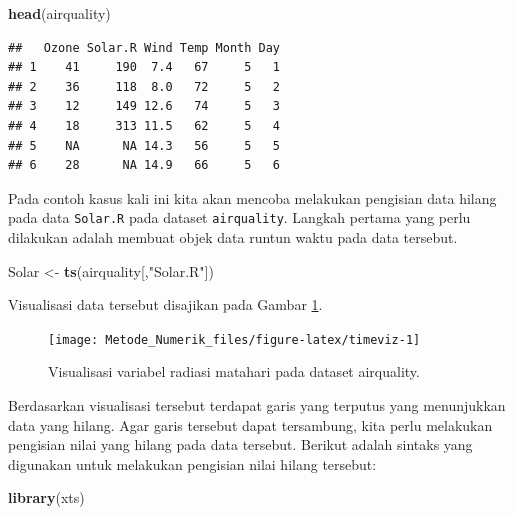 \documentclass[
]{book}
\newenvironment{Shaded}{\begin{snugshade}}{\end{snugshade}}
\newcommand{\FunctionTok}[1]{\textcolor[rgb]{0.13,0.29,0.53}{\textbf{#1}}}
\newcommand{\NormalTok}[1]{#1}
\newcommand{\OtherTok}[1]{\textcolor[rgb]{0.56,0.35,0.01}{#1}}
\newcommand{\StringTok}[1]{\textcolor[rgb]{0.31,0.60,0.02}{#1}}
\theoremstyle{definition}
\theoremstyle{definition}
\theoremstyle{definition}
\theoremstyle{definition}
\theoremstyle{remark}
\begin{document}
\begin{Shaded}
\begin{Highlighting}[]
\FunctionTok{head}\NormalTok{(airquality)}
\end{Highlighting}
\end{Shaded}

\begin{verbatim}
##   Ozone Solar.R Wind Temp Month Day
## 1    41     190  7.4   67     5   1
## 2    36     118  8.0   72     5   2
## 3    12     149 12.6   74     5   3
## 4    18     313 11.5   62     5   4
## 5    NA      NA 14.3   56     5   5
## 6    28      NA 14.9   66     5   6
\end{verbatim}

Pada contoh kasus kali ini kita akan mencoba melakukan pengisian data hilang pada data \texttt{Solar.R} pada dataset \texttt{airquality}. Langkah pertama yang perlu dilakukan adalah membuat objek data runtun waktu pada data tersebut.

\begin{Shaded}
\begin{Highlighting}[]
\NormalTok{Solar }\OtherTok{\textless{}{-}} \FunctionTok{ts}\NormalTok{(airquality[,}\StringTok{"Solar.R"}\NormalTok{])}
\end{Highlighting}
\end{Shaded}

Visualisasi data tersebut disajikan pada Gambar \ref{fig:timeviz}.

\begin{figure}

{\centering \texttt{[image: Metode\_Numerik\_files/figure-latex/timeviz-1]} 

}

\caption{Visualisasi variabel radiasi matahari pada dataset airquality.}\label{fig:timeviz}
\end{figure}

Berdasarkan visualisasi tersebut terdapat garis yang terputus yang menunjukkan data yang hilang. Agar garis tersebut dapat tersambung, kita perlu melakukan pengisian nilai yang hilang pada data tersebut. Berikut adalah sintaks yang digunakan untuk melakukan pengisian nilai hilang tersebut:

\begin{Shaded}
\begin{Highlighting}[]
\FunctionTok{library}\NormalTok{(xts)}
\end{Highlighting}
\end{Shaded}
\end{document}
